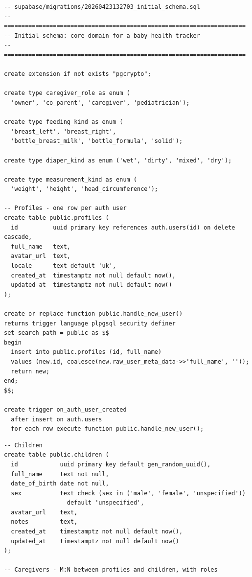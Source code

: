 \documentclass[%
  ukrainian, utf8, columnvii, simple,
  hpadding=10mm, vpadding=10mm, reduceheight=2mm,
  floatsection,
]{eskdtext}
\begin{document}
{\fontsize{8.5}{10.2}\selectfont

\begin{verbatim}
-- supabase/migrations/20260423132703_initial_schema.sql
-- =====================================================================
-- Initial schema: core domain for a baby health tracker
-- =====================================================================

create extension if not exists "pgcrypto";

create type caregiver_role as enum (
  'owner', 'co_parent', 'caregiver', 'pediatrician');

create type feeding_kind as enum (
  'breast_left', 'breast_right',
  'bottle_breast_milk', 'bottle_formula', 'solid');

create type diaper_kind as enum ('wet', 'dirty', 'mixed', 'dry');

create type measurement_kind as enum (
  'weight', 'height', 'head_circumference');

-- Profiles - one row per auth user
create table public.profiles (
  id          uuid primary key references auth.users(id) on delete cascade,
  full_name   text,
  avatar_url  text,
  locale      text default 'uk',
  created_at  timestamptz not null default now(),
  updated_at  timestamptz not null default now()
);

create or replace function public.handle_new_user()
returns trigger language plpgsql security definer
set search_path = public as $$
begin
  insert into public.profiles (id, full_name)
  values (new.id, coalesce(new.raw_user_meta_data->>'full_name', ''));
  return new;
end;
$$;

create trigger on_auth_user_created
  after insert on auth.users
  for each row execute function public.handle_new_user();
\end{verbatim}
\pagebreak
\begin{verbatim}
-- Children
create table public.children (
  id            uuid primary key default gen_random_uuid(),
  full_name     text not null,
  date_of_birth date not null,
  sex           text check (sex in ('male', 'female', 'unspecified'))
                  default 'unspecified',
  avatar_url    text,
  notes         text,
  created_at    timestamptz not null default now(),
  updated_at    timestamptz not null default now()
);

-- Caregivers - M:N between profiles and children, with roles


\end{verbatim}}
\end{document}
